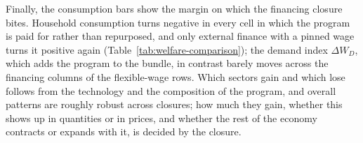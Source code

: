 Finally, the consumption bars show the margin on which the financing closure bites. Household consumption turns negative in every cell in which the program is paid for rather than repurposed, and only external finance with a pinned wage turns it positive again (Table~\ref{tab:welfare-comparison}); the demand index $\Delta W_D$, which adds the program to the bundle, in contrast barely moves across the financing columns of the flexible-wage rows. Which sectors gain and which lose follows from the technology and the composition of the program, and overall patterns are roughly robust across closures; how much they gain, whether this shows up in quantities or in prices, and whether the rest of the economy contracts or expands with it, is decided by the closure.



